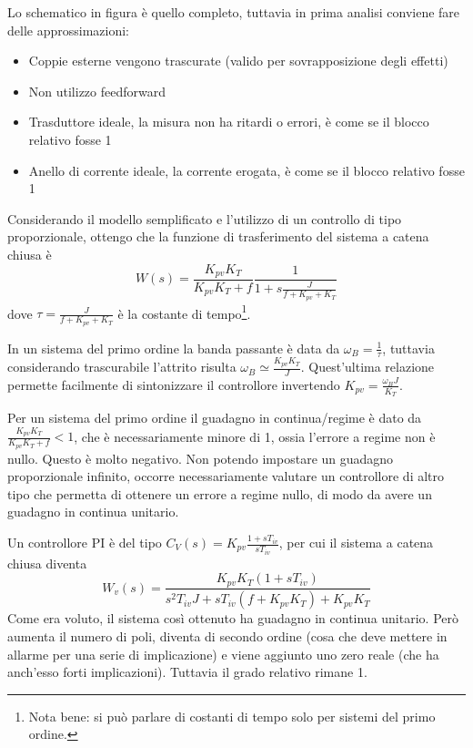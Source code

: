 Lo schematico in figura è quello completo, tuttavia in prima analisi conviene fare delle approssimazioni:
\begin{itemize}
    \item Coppie esterne vengono trascurate (valido per sovrapposizione degli effetti)
    \item Non utilizzo feedforward
    \item Trasduttore ideale, la misura non ha ritardi o errori, è come se il blocco relativo fosse 1
    \item Anello di corrente ideale, la corrente erogata, è come se il blocco relativo fosse 1
\end{itemize}


Considerando il modello semplificato e l'utilizzo di un controllo di tipo proporzionale, ottengo che la funzione di trasferimento del sistema a catena chiusa è 
\[W(s)=\frac{K_{pv}K_T}{K_{pv}K_T+f}\frac{1}{1+s\frac{J}{f+K_{pv}+K_T}}\]
dove \(\tau = \frac{J}{f+K_{pv}+K_T}\) è la costante di tempo\footnote{Nota bene: si può parlare di costanti di tempo solo per sistemi del primo ordine.}.


In un sistema del primo ordine la banda passante è data da \(\omega_B=\frac{1}{\tau}\), tuttavia considerando trascurabile l'attrito risulta \(\omega_B\simeq \frac{K_{pv}K_T}{J}\). Quest'ultima relazione permette facilmente di sintonizzare il controllore invertendo \(K_{pv}=\frac{\omega_B J}{K_T}\).

Per un sistema del primo ordine il guadagno in continua/regime è dato da \(\frac{K_{pv}K_T}{K_{pv}K_T+f}<1\), che è necessariamente minore di 1, ossia l'errore a regime non è nullo. Questo è molto negativo. Non potendo impostare un guadagno proporzionale infinito, occorre necessariamente valutare un controllore di altro tipo che permetta di ottenere un errore a regime nullo, di modo da avere un guadagno in continua unitario.

Un controllore PI è del tipo \(C_V(s)=K_{pv}\frac{1+sT_{iv}}{sT_{iv}}\), per cui il sistema a catena chiusa diventa 
\[W_v(s)=\frac{K_{pv}K_T(1+sT_{iv})}{s^2T_{iv}J + sT_{iv}(f+K_{pv}K_T)+K_{pv}K_T}\]
Come era voluto, il sistema così ottenuto ha guadagno in continua unitario.
Però aumenta il numero di poli, diventa di secondo ordine (cosa che deve mettere in allarme per una serie di implicazione) e viene aggiunto uno zero reale (che ha anch'esso forti implicazioni). Tuttavia il grado relativo rimane 1.

